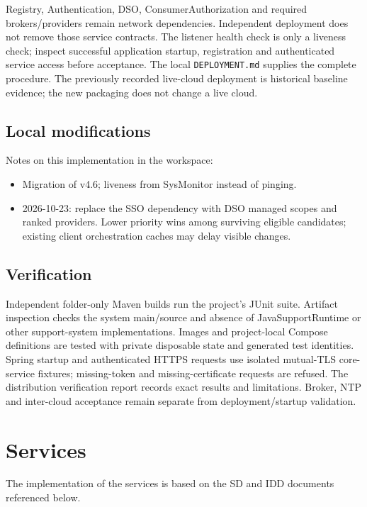 \documentclass[a4paper]{arrowhead}
\begin{document}
Registry, Authentication, DSO, ConsumerAuthorization and required brokers/providers remain network dependencies. Independent deployment does not remove those service contracts. The listener health check is only a liveness check; inspect successful application startup, registration and authenticated service access before acceptance. The local \texttt{DEPLOYMENT.md} supplies the complete procedure. The previously recorded live-cloud deployment is historical baseline evidence; the new packaging does not change a live cloud.

\subsection{Local modifications}
\label{sec:local}

Notes on this implementation in the workspace:
\begin{itemize}
  \item Migration of v4.6; liveness from SysMonitor instead of pinging.
  \item 2026-10-23: replace the SSO dependency with DSO managed scopes and ranked providers. Lower priority wins among surviving eligible candidates; existing client orchestration caches may delay visible changes.
\end{itemize}

\subsection{Verification}

Independent folder-only Maven builds run the project's JUnit suite. Artifact inspection checks the system main/source and absence of JavaSupportRuntime or other support-system implementations. Images and project-local Compose definitions are tested with private disposable state and generated test identities. Spring startup and authenticated HTTPS requests use isolated mutual-TLS core-service fixtures; missing-token and missing-certificate requests are refused. The distribution verification report records exact results and limitations. Broker, NTP and inter-cloud acceptance remain separate from deployment/startup validation.

\newpage

\section{Services}
\label{sec:services}

The implementation of the services is based on the SD and IDD documents referenced below.
\end{document}
